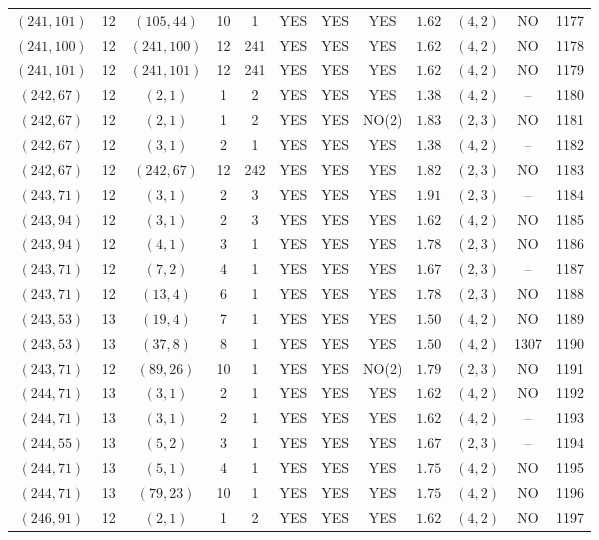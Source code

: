 \begin{longtable}{|c|c|c|c|c|c|c|c|c|c|c|c|}
$(241,101)$ & 12 & $(105,44)$ & 10 & 1 & YES & YES & YES & $1.62$ & $(4,2)$ & NO & 1177\\
$(241,100)$ & 12 & $(241,100)$ & 12 & 241 & YES & YES & YES & $1.62$ & $(4,2)$ & NO & 1178\\
$(241,101)$ & 12 & $(241,101)$ & 12 & 241 & YES & YES & YES & $1.62$ & $(4,2)$ & NO & 1179\\
$(242,67)$ & 12 & $(2,1)$ & 1 & 2 & YES & YES & YES & $1.38$ & $(4,2)$ & -- & 1180\\
$(242,67)$ & 12 & $(2,1)$ & 1 & 2 & YES & YES & NO(2) & $1.83$ & $(2,3)$ & NO & 1181\\
$(242,67)$ & 12 & $(3,1)$ & 2 & 1 & YES & YES & YES & $1.38$ & $(4,2)$ & -- & 1182\\
$(242,67)$ & 12 & $(242,67)$ & 12 & 242 & YES & YES & YES & $1.82$ & $(2,3)$ & NO & 1183\\
$(243,71)$ & 12 & $(3,1)$ & 2 & 3 & YES & YES & YES & $1.91$ & $(2,3)$ & -- & 1184\\
$(243,94)$ & 12 & $(3,1)$ & 2 & 3 & YES & YES & YES & $1.62$ & $(4,2)$ & NO & 1185\\
$(243,94)$ & 12 & $(4,1)$ & 3 & 1 & YES & YES & YES & $1.78$ & $(2,3)$ & NO & 1186\\
$(243,71)$ & 12 & $(7,2)$ & 4 & 1 & YES & YES & YES & $1.67$ & $(2,3)$ & -- & 1187\\
$(243,71)$ & 12 & $(13,4)$ & 6 & 1 & YES & YES & YES & $1.78$ & $(2,3)$ & NO & 1188\\
$(243,53)$ & 13 & $(19,4)$ & 7 & 1 & YES & YES & YES & $1.50$ & $(4,2)$ & NO & 1189\\
$(243,53)$ & 13 & $(37,8)$ & 8 & 1 & YES & YES & YES & $1.50$ & $(4,2)$ & 1307 & 1190\\
$(243,71)$ & 12 & $(89,26)$ & 10 & 1 & YES & YES & NO(2) & $1.79$ & $(2,3)$ & NO & 1191\\
$(244,71)$ & 13 & $(3,1)$ & 2 & 1 & YES & YES & YES & $1.62$ & $(4,2)$ & NO & 1192\\
$(244,71)$ & 13 & $(3,1)$ & 2 & 1 & YES & YES & YES & $1.62$ & $(4,2)$ & -- & 1193\\
$(244,55)$ & 13 & $(5,2)$ & 3 & 1 & YES & YES & YES & $1.67$ & $(2,3)$ & -- & 1194\\
$(244,71)$ & 13 & $(5,1)$ & 4 & 1 & YES & YES & YES & $1.75$ & $(4,2)$ & NO & 1195\\
$(244,71)$ & 13 & $(79,23)$ & 10 & 1 & YES & YES & YES & $1.75$ & $(4,2)$ & NO & 1196\\
$(246,91)$ & 12 & $(2,1)$ & 1 & 2 & YES & YES & YES & $1.62$ & $(4,2)$ & NO & 1197\\

\end{longtable}
